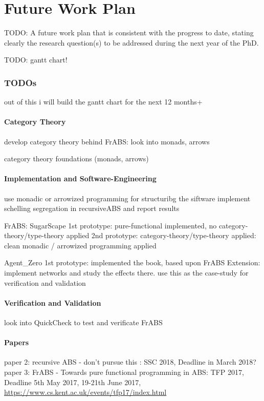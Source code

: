 \chapter{Future Work Plan}
\label{chap:future}

TODO: A future work plan that is consistent with the progress to date, stating clearly the research question(s) to be addressed during the next year of the PhD.

TODO: gantt chart!


\subsection{TODOs}
out of this i will build the gantt chart for the next 12 months+

\subsubsection{Category Theory}
develop category theory behind FrABS: look into monads, arrows

category theory foundations (monads, arrows)

\subsubsection{Implementation and Software-Engineering}
use monadic or arrowized programming for structuribg the siftware
implement schelling segregation in recursiveABS and report results

FrABS: SugarScape
1st prototype: pure-functional implemented, no category-theory/type-theory applied
2nd prototype: category-theory/type-theory applied: clean monadic / arrowized programming applied

Agent\_Zero
1st prototype: implemented the book, based upon FrABS 
Extension: implement networks and study the effects there. use this as the case-study for verification and validation

\subsubsection{Verification and Validation}
look into QuickCheck to test and verificate FrABS

\subsubsection{Papers}
paper 2: recursive ABS - don't pursue this : SSC 2018, Deadline in March 2018?
paper 3: FrABS - Towards pure functional programming in ABS: TFP 2017, Deadline 5th May 2017, 19-21th June 2017, \url{https://www.cs.kent.ac.uk/events/tfp17/index.html}

